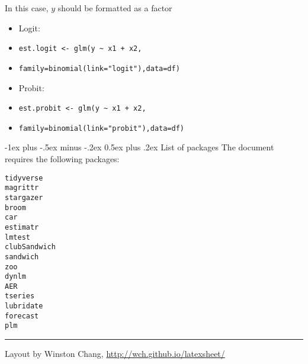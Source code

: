 \documentclass[10pt,landscape]{article}
\makeatletter
\renewcommand{\section}{\@startsection{section}{1}{0mm}%
                                {-1ex plus -.5ex minus -.2ex}%
                                {0.5ex plus .2ex}%
                                {\normalfont\large\bfseries}}
\makeatother
\begin{document}
\begin{multicols}{3}
\smallskip{}

In this case, $y$ should be formatted as a factor

\smallskip{}

\begin{itemize}
    \item Logit:
    \item[] \verb!est.logit <- glm(y ~ x1 + x2,!
    \item[] \verb!family=binomial(link="logit"),data=df)!
    \item Probit:
    \item[] \verb!est.probit <- glm(y ~ x1 + x2,!
    \item[] \verb!family=binomial(link="probit"),data=df)!
\end{itemize}





\section{List of packages}
The document requires the following packages:

\smallskip{}

\begin{multicols}{4}
\verb!tidyverse!  \\
\verb!magrittr!  \\
\verb!stargazer!  \\
\verb!broom!  \\
\verb!car!  \\
\verb!estimatr!  \\
\verb!lmtest!  \\
\verb!clubSandwich!  \\
\verb!sandwich!  \\
\verb!zoo!  \\
\verb!dynlm!  \\
\verb!AER!  \\
\verb!tseries!  \\
\verb!lubridate!  \\
\verb!forecast!  \\
\verb!plm!  \\
\end{multicols}

\rule{0.3\linewidth}{0.25pt}
\scriptsize

Layout by Winston Chang, \href{http://wch.github.io/latexsheet/}{http://wch.github.io/latexsheet/}


\end{multicols}
\end{document}
